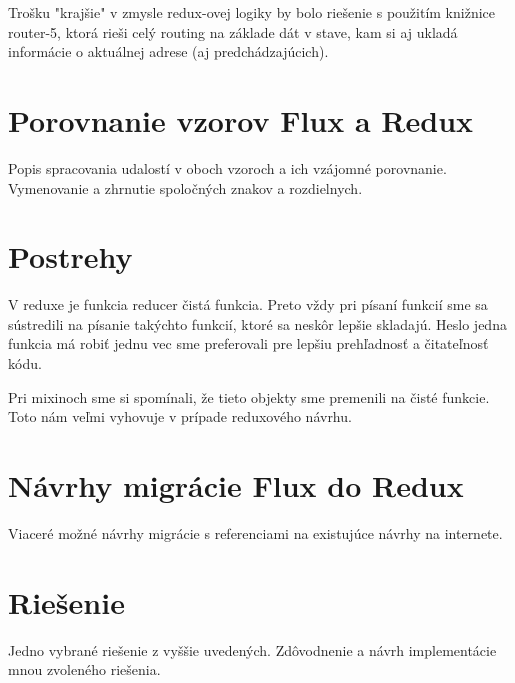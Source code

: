 Trošku "krajšie" v zmysle redux-ovej logiky by bolo riešenie s použitím knižnice router-5, ktorá rieši celý routing na základe dát v stave, kam si aj ukladá informácie o aktuálnej adrese (aj predchádzajúcich).%

\cite[gettting started]{Redux}






\section{Porovnanie vzorov Flux a Redux}
Popis spracovania udalostí v oboch vzoroch a ich vzájomné porovnanie. Vymenovanie a zhrnutie spoločných znakov a rozdielnych.

\section{Postrehy}
V reduxe je funkcia reducer čistá funkcia. Preto vždy pri písaní funkcií sme sa sústredili na písanie takýchto funkcií, ktoré sa neskôr lepšie skladajú. Heslo jedna funkcia má robiť jednu vec sme preferovali pre lepšiu prehľadnosť a čitateľnosť kódu.

Pri mixinoch sme si spomínali, že tieto objekty sme premenili na čisté funkcie. Toto nám veľmi vyhovuje v prípade reduxového návrhu.

\section{Návrhy migrácie Flux do Redux}%
Viaceré možné návrhy migrácie s referenciami na existujúce návrhy na internete.

\section{Riešenie}
Jedno vybrané riešenie z vyššie uvedených. Zdôvodnenie a návrh implementácie mnou zvoleného riešenia.

